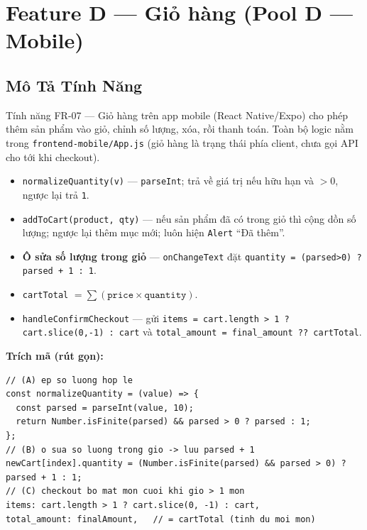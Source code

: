 \documentclass[12pt, a4paper]{report}
\begin{document}
\chapter{Feature D — Giỏ hàng (Pool D — Mobile)}

\section{Mô Tả Tính Năng}
Tính năng FR-07 — Giỏ hàng trên app mobile (React Native/Expo) cho phép thêm
sản phẩm vào giỏ, chỉnh số lượng, xóa, rồi thanh toán. Toàn bộ logic nằm trong
\texttt{frontend-mobile/App.js} (giỏ hàng là trạng thái phía client, chưa gọi API cho
tới khi checkout).

\begin{itemize}
    \item \texttt{normalizeQuantity(v)} — \texttt{parseInt}; trả về giá trị nếu hữu hạn và
    $>0$, ngược lại trả \texttt{1}.
    \item \texttt{addToCart(product, qty)} — nếu sản phẩm đã có trong giỏ thì cộng dồn số
    lượng; ngược lại thêm mục mới; luôn hiện \texttt{Alert} ``Đã thêm''.
    \item \textbf{Ô sửa số lượng trong giỏ} — \texttt{onChangeText} đặt
    \texttt{quantity = (parsed>0) ? parsed + 1 : 1}.
    \item \texttt{cartTotal} $= \sum(\texttt{price}\times\texttt{quantity})$.
    \item \texttt{handleConfirmCheckout} — gửi \verb|items = cart.length > 1 ? cart.slice(0,-1) : cart|
    và \texttt{total\_amount = final\_amount ?? cartTotal}.
\end{itemize}

\vspace{4pt}
\noindent\textbf{Trích mã (rút gọn):}
\begin{lstlisting}[caption={Giỏ hàng — App.js (rút gọn)},numbers=none]
// (A) ep so luong hop le
const normalizeQuantity = (value) => {
  const parsed = parseInt(value, 10);
  return Number.isFinite(parsed) && parsed > 0 ? parsed : 1;
};
// (B) o sua so luong trong gio -> luu parsed + 1
newCart[index].quantity = (Number.isFinite(parsed) && parsed > 0) ? parsed + 1 : 1;
// (C) checkout bo mat mon cuoi khi gio > 1 mon
items: cart.length > 1 ? cart.slice(0, -1) : cart,
total_amount: finalAmount,   // = cartTotal (tinh du moi mon)
\end{lstlisting}
\end{document}

